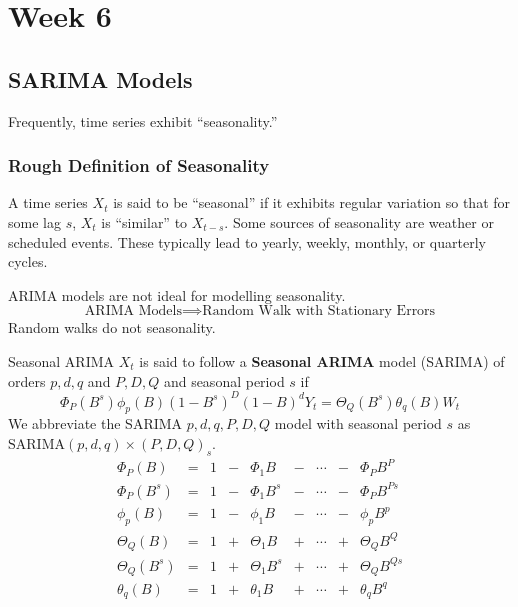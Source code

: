 \chapter{Week 6}
\section{SARIMA Models}
Frequently, time series exhibit ``seasonality.''
\subsection*{Rough Definition of Seasonality}
A time series $ X_t $ is said to be ``seasonal''
if it exhibits regular variation so that for some lag $ s $,
$ X_t $ is ``similar'' to $ X_{t-s} $.
Some sources of seasonality are weather or scheduled events.
These typically lead to yearly, weekly, monthly, or quarterly cycles.
\begin{Remark}{}{}
      ARIMA models are not ideal for modelling seasonality.
      \[ \text{ARIMA Models}\implies\text{Random Walk with Stationary Errors} \]
      Random walks do not seasonality.
\end{Remark}
\begin{Definition}{Seasonal ARIMA}{}
      $ X_t $ is said to follow a \textbf{Seasonal ARIMA} model (SARIMA)
      of orders $ p,d,q $ and $ P,D,Q $ and seasonal period $ s $
      if
      \[ \Phi_P(B^s)\phi_p(B)(1-B^s)^D(1-B)^d Y_t=\Theta_Q(B^s)\theta_q(B)W_t \]
      We abbreviate the SARIMA $ p,d,q,P,D,Q $ model with seasonal
      period $ s $ as $ \text{SARIMA}(p,d,q)\times(P,D,Q)_s $.
      \[ \begin{array}{ccccccccc}
                  \Phi_P(B)     & = & 1 & - & \Phi_1 B     & - & \cdots & - & \Phi_P B^P      \\
                  \Phi_P(B^s)   & = & 1 & - & \Phi_1 B^s   & - & \cdots & - & \Phi_P B^{Ps}   \\
                  \phi_p(B)     & = & 1 & - & \phi_1 B     & - & \cdots & - & \phi_p B^p      \\
                  \Theta_Q(B)   & = & 1 & + & \Theta_1 B   & + & \cdots & + & \Theta_Q B^Q    \\
                  \Theta_Q(B^s) & = & 1 & + & \Theta_1 B^s & + & \cdots & + & \Theta_Q B^{Qs} \\
                  \theta_q(B)   & = & 1 & + & \theta_1 B   & + & \cdots & + & \theta_q B^q    \\
            \end{array} \]
\end{Definition}
